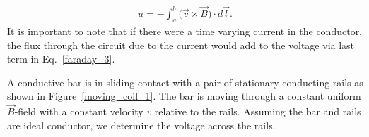 \documentclass[12pt,a4paper,oneside]{book}
\begin{document}
\begin{onehalfspace}
 \begin{equation}\label{faraday_4}
	\begin{aligned}
		u=-\int_{a}^{b}\big(\vec{v}\times\vec{B}\big)\cdot d\vec{l}.
	\end{aligned}
\end{equation} 
It is important to note that if there were a time varying current in the conductor, the flux through the circuit due to the current would add to the voltage via last term in Eq.~\eqref{faraday_3}.
\begin{example}
A conductive bar is in sliding contact with a pair of stationary conducting rails as shown in Figure~\ref{moving_coil_1}. The bar is moving through a constant uniform $\vec{B}$-field with a constant velocity $v$ relative to the rails. Assuming the bar and rails are ideal conductor, we determine the voltage across the rails.


\end{example}
\end{onehalfspace}
\end{document}
